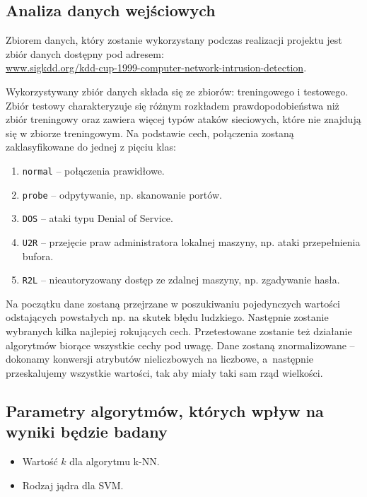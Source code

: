 \documentclass[a4paper, 12pt]{article}
\begin{document}
\subsection{Analiza danych wejściowych}

Zbiorem danych, który zostanie wykorzystany podczas realizacji projektu jest zbiór danych dostępny 
pod adresem: \\
\url{www.sigkdd.org/kdd-cup-1999-computer-network-intrusion-detection}.

Wykorzystywany zbiór danych składa się ze zbiorów: treningowego i testowego. 
Zbiór testowy charakteryzuje się różnym rozkładem prawdopodobieństwa niż zbiór treningowy oraz 
zawiera więcej typów ataków sieciowych, które nie znajdują się w zbiorze treningowym.
Na podstawie cech, połączenia zostaną zaklasyfikowane do jednej z pięciu klas:

\begin{enumerate}
 \item \texttt{normal} -- połączenia prawidłowe.
 \item \texttt{probe} -- odpytywanie, np. skanowanie portów.
 \item \texttt{DOS} -- ataki typu Denial of Service.
 \item \texttt{U2R} -- przejęcie praw administratora lokalnej maszyny, np. ataki przepełnienia bufora.
 \item \texttt{R2L} -- nieautoryzowany dostęp ze zdalnej maszyny, np. zgadywanie hasła.
\end{enumerate}

Na początku dane zostaną przejrzane w poszukiwaniu pojedynczych wartości odstających
powstałych np. na skutek błędu ludzkiego. Następnie zostanie wybranych kilka najlepiej rokujących
cech. Przetestowane zostanie też działanie algorytmów biorące wszystkie cechy pod uwagę.
Dane zostaną znormalizowane -- dokonamy konwersji atrybutów nieliczbowych na liczbowe,
a~następnie przeskalujemy wszystkie wartości, tak aby miały taki sam rząd wielkości.

\subsection{Parametry algorytmów, których wpływ na wyniki będzie badany}

\begin{itemize}
 \item Wartość $k$ dla algorytmu k-NN.
 \item Rodzaj jądra dla SVM.
\end{itemize}
\end{document}
